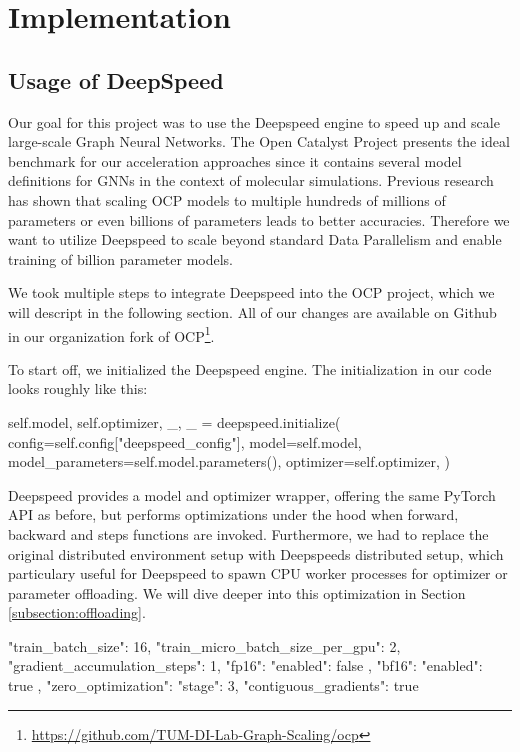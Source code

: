 \section{Implementation}
\label{section:implementation}

\subsection{Usage of DeepSpeed}

Our goal for this project was to use the Deepspeed engine to speed up and scale 
large-scale Graph Neural Networks. The Open Catalyst Project presents the ideal 
benchmark for our acceleration approaches since it contains several model definitions 
for GNNs in the context of molecular simulations. Previous research has shown 
that scaling OCP models to multiple hundreds of millions of parameters or even 
billions of parameters leads to better accuracies. Therefore we want to utilize 
Deepspeed to scale beyond standard Data Parallelism and enable training of billion 
parameter models.

We took multiple steps to integrate Deepspeed into the OCP project, which we will 
descript in the following section. All of our changes are available on Github in our 
organization fork of OCP\footnote{\url{https://github.com/TUM-DI-Lab-Graph-Scaling/ocp}}.

To start off, we initialized the Deepspeed engine. 
The initialization in our code looks roughly like this:

\begin{python}
self.model, self.optimizer, _, _ = deepspeed.initialize(
                    config=self.config["deepspeed_config"],
                    model=self.model,
                    model_parameters=self.model.parameters(),
                    optimizer=self.optimizer,
                )
\end{python}

Deepspeed provides a model and optimizer wrapper, offering the same PyTorch API as 
before, but performs optimizations under the hood when forward, backward and steps 
functions are invoked. Furthermore, we had to replace the original distributed 
environment setup with Deepspeeds distributed setup, which particulary useful for 
Deepspeed to spawn CPU worker processes for optimizer or parameter offloading. We 
will dive deeper into this optimization in Section \ref*{subsection:offloading}.


\begin{json}
{
    "train_batch_size": 16,
    "train_micro_batch_size_per_gpu": 2,
    "gradient_accumulation_steps": 1,
    "fp16": {
        "enabled": false
    },
    "bf16": {
        "enabled": true
    },
    "zero_optimization": {
        "stage": 3,
        "contiguous_gradients": true
    }
}
\end{json}